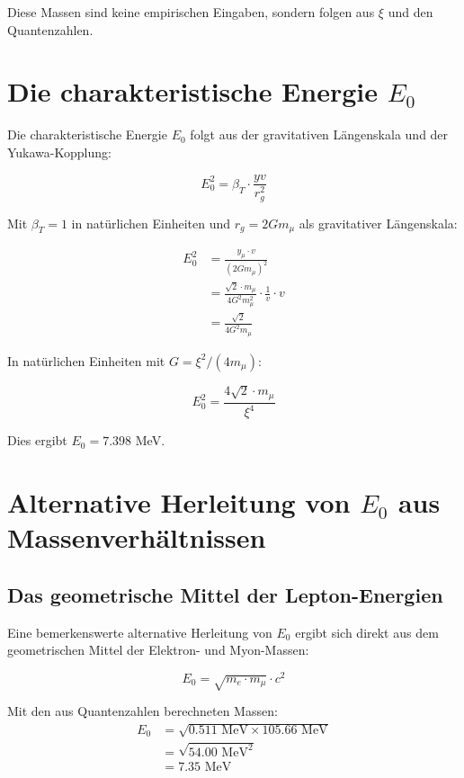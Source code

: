 	Diese Massen sind keine empirischen Eingaben, sondern folgen aus $\xi$ und den Quantenzahlen.
	
	\section{Die charakteristische Energie $E_0$}
	
	Die charakteristische Energie $E_0$ folgt aus der gravitativen Längenskala und der Yukawa-Kopplung:
	
	\begin{equation}
		E_0^2 = \beta_T \cdot \frac{yv}{r_g^2}
	\end{equation}
	
	Mit $\beta_T = 1$ in natürlichen Einheiten und $r_g = 2Gm_\mu$ als gravitativer Längenskala:
	
	\begin{align}
		E_0^2 &= \frac{y_\mu \cdot v}{(2Gm_\mu)^2}\\
		&= \frac{\sqrt{2} \cdot m_\mu}{4G^2 m_\mu^2} \cdot \frac{1}{v} \cdot v\\
		&= \frac{\sqrt{2}}{4G^2 m_\mu}
	\end{align}
	
	In natürlichen Einheiten mit $G = \xi^2/(4m_\mu)$:
	
	\begin{equation}
		E_0^2 = \frac{4\sqrt{2} \cdot m_\mu}{\xi^4}
	\end{equation}
	
	Dies ergibt $E_0 = 7.398$ MeV.
	
	\section{Alternative Herleitung von $E_0$ aus Massenverhältnissen}
	
	\subsection{Das geometrische Mittel der Lepton-Energien}
	
	Eine bemerkenswerte alternative Herleitung von $E_0$ ergibt sich direkt aus dem geometrischen Mittel der Elektron- und Myon-Massen:
	
	\begin{equation}
		E_0 = \sqrt{m_e \cdot m_\mu} \cdot c^2
	\end{equation}
	
	Mit den aus Quantenzahlen berechneten Massen:
	\begin{align}
		E_0 &= \sqrt{0.511 \text{ MeV} \times 105.66 \text{ MeV}}\\
		&= \sqrt{54.00 \text{ MeV}^2}\\
		&= 7.35 \text{ MeV}
	\end{align}
	
